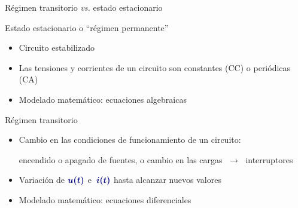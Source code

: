 \documentclass[aspectratio=169, usenames,svgnames,dvipsnames]{beamer}
\begin{document}
\begin{frame}{Régimen transitorio \hspace{3mm}\textit{vs.}\hspace{3mm} estado estacionario}
    \vspace{4mm}
    
    \begin{block}{Estado estacionario o ``régimen permanente''}
        \begin{itemize}
            \vspace{1mm}
            \item Circuito \alert{estabilizado}
            
            \vspace{1mm}
            \item Las \alert{tensiones} y \alert{corrientes} de un circuito son \alert{constantes} (CC) o \alert{periódicas} (CA)

            \vspace{1mm}
            \item Modelado matemático: \alert{ecuaciones algebraicas}

            \vspace{1mm}
        \end{itemize}        
    \end{block}

    \vspace{2mm}
    \begin{block}{Régimen transitorio}
        \begin{itemize}
            \vspace{1mm}
            \item \alert{Cambio} en las \alert{condiciones} de funcionamiento de un \alert{circuito}: 

            \vspace{1mm}
            encendido o apagado de fuentes, o cambio en las cargas $\;\rightarrow\;$ \alert{interruptores}
            
            \vspace{1mm}
            \item Variación de ${\boldsymbol{\color{blue!50!black} u(t)}}$ e $\,{\boldsymbol{\color{blue!50!black} i(t)}}$ hasta alcanzar nuevos valores

            \vspace{1mm}
            \item Modelado matemático: \alert{ecuaciones diferenciales}

            \vspace{1mm}
        \end{itemize}
    \end{block}
\end{frame}
\end{document}
